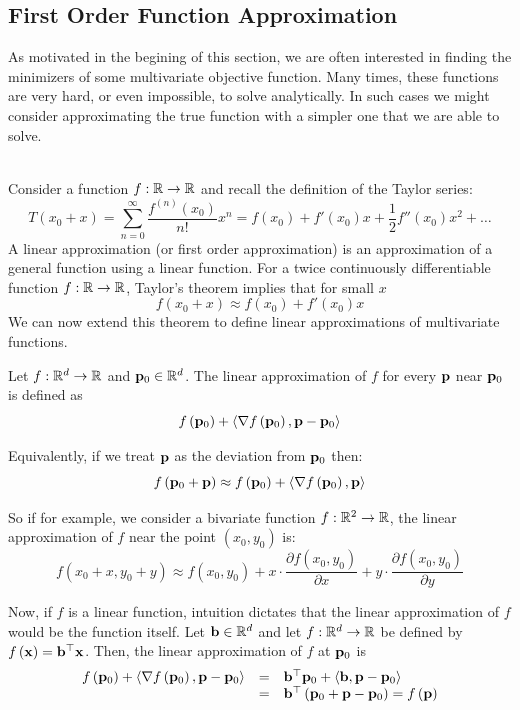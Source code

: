 \subsection{First Order Function Approximation}
As motivated in the begining of this section, we are often interested in finding the minimizers of some multivariate objective function. Many times, these functions are very hard, or even impossible, to solve analytically. In such cases we might consider approximating the true function with a simpler one that we are able to solve. 

~\\Consider a function $f:\mathbb{R}\rightarrow\mathbb{R}$ and recall the definition of the Taylor series:
$$T\left(x_0+x\right)=\sum_{n=0}^\infty \frac{f^{\left(n\right)}\left(x_0\right)}{n!}x^n = f\left(x_0\right)+f'\left(x_0\right)x+\frac{1}{2}f''\left(x_0\right)x^2 + \ldots$$
A linear approximation (or first order approximation) is an approximation of a general function using a linear function. For a twice continuously differentiable function $f:\mathbb{R}\rightarrow\mathbb{R}$, Taylor's theorem implies that for small $x$
$$f\left(x_0+x\right) \approx f\left(x_0\right) + f'\left(x_0\right)x$$
We can now extend this theorem to define linear approximations of multivariate functions.

\begin{definition}
Let $f:\mathbb{R}^d\rightarrow\mathbb{R}$ and $\mathbf{p}_0\in\mathbb{R}^d$. The linear approximation of $f$ for every $\mathbf{p}$ near $\mathbf{p}_0$ is defined as $$f\left(\mathbf{p}_0\right)+\left\langle \nabla f\left(\mathbf{p}_0\right),\mathbf{p}-\mathbf{p}_0\right\rangle$$
	
Equivalently, if we treat $\mathbf{p}$ as the deviation from $\mathbf{p}_0$ then: 
$$f\left(\mathbf{p}_0 + \mathbf{p}\right)\approx f\left(\mathbf{p}_0\right)+ \left\langle \nabla f\left(\mathbf{p}_0\right),\mathbf{p}\right\rangle$$
\end{definition}

So if for example, we consider a bivariate function $f:\mathbb{R}^2\rightarrow\mathbb{R}$, the linear approximation of $f$ near the point $\left(x_0,y_0\right)$ is:
$$f\left(x_0+x,y_0+y\right)\approx f\left(x_0,y_0\right)+x\cdot\frac{\partial f\left(x_0,y_0\right)}{\partial x}+y\cdot\frac{\partial f\left(x_0,y_0\right)}{\partial y}$$

Now, if $f$ is a linear function, intuition dictates that the linear approximation of $f$ would be the function itself. Let $\mathbf{b}\in\mathbb{R}^d$ and let $f:\mathbb{R}^d\rightarrow\mathbb{R}$ be defined by $f\left(\mathbf{x}\right)=\mathbf{b}^\top\mathbf{x}$. Then, the linear approximation of $f$ at $\mathbf{p}_0$ is
$$ 
\begin{array}{ccl}
f\left(\mathbf{p}_0\right)+ \left\langle \nabla f\left(\mathbf{p}_0\right),\mathbf{p}-\mathbf{p}_0\right\rangle & =  & \mathbf{b}^\top \mathbf{p}_0 + \left\langle \mathbf{b},\mathbf{p}-\mathbf{p}_0\right\rangle \\
& = & \mathbf{b}^\top\left(\mathbf{p}_0+\mathbf{p}-\mathbf{p}_0\right) = f\left(\mathbf{p}\right)
\end{array}
$$

